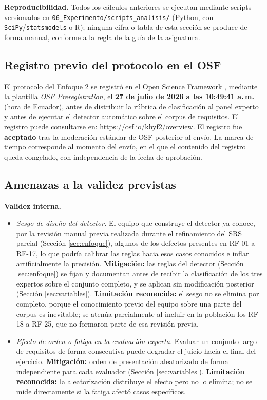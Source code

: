 \documentclass[journal,onecolumn]{IEEEtran}
\begin{document}
	\textbf{Reproducibilidad.} Todos los cálculos anteriores se ejecutan
	mediante scripts versionados en \texttt{06\_Experimento/scripts\_analisis/}
	(Python, con \texttt{SciPy}/\texttt{statsmodels} o R); ninguna cifra o
	tabla de esta sección se produce de forma manual, conforme a la regla de
	la guía de la asignatura.
	
	\subsection{Registro previo del protocolo en el OSF}
	\label{sec:osf}
	
	El protocolo del Enfoque 2 se registró en el Open Science Framework
	\cite{nosek2018}, mediante la plantilla \emph{OSF Preregistration}, el
	\textbf{27 de julio de 2026 a las 10:49:41 a.\,m.} (hora de Ecuador), antes
	de distribuir la rúbrica de clasificación al panel experto y antes de
	ejecutar el detector automático sobre el corpus de requisitos. El registro
	puede consultarse en:
	\url{https://osf.io/khyf2/overview}.
	El registro fue \textbf{aceptado} tras la moderación estándar de OSF
	posterior al envío. La marca de tiempo corresponde al momento del envío, en
	el que el contenido del registro queda congelado, con independencia de la
	fecha de aprobación.
	
	\subsection{Amenazas a la validez previstas}
	\label{sec:amenazas}
	
	\textbf{Validez interna.}
	\begin{itemize}[leftmargin=*]
		\item \emph{Sesgo de diseño del detector.} El equipo que construye el
		detector ya conoce, por la revisión manual previa realizada durante
		el refinamiento del SRS parcial (Sección \ref{sec:enfoque}), algunos
		de los defectos presentes en RF-01 a RF-17, lo que podría calibrar
		las reglas hacia esos casos conocidos e inflar artificialmente la
		precisión. \textbf{Mitigación:}
		las reglas del detector (Sección \ref{sec:enfoque}) se fijan y
		documentan antes de recibir la clasificación de los tres expertos
		sobre el conjunto completo, y se aplican sin modificación posterior
		(Sección \ref{sec:variables}). \textbf{Limitación reconocida:} el
		sesgo no se elimina por completo, porque el conocimiento previo del
		equipo sobre una parte del corpus es inevitable; se atenúa
		parcialmente al incluir en la población los RF-18 a RF-25, que no
		formaron parte de esa revisión previa.
		\item \emph{Efecto de orden o fatiga en la evaluación experta.}
		Evaluar un conjunto largo de requisitos de forma consecutiva puede
		degradar el juicio hacia el final del ejercicio. \textbf{Mitigación:}
		orden de presentación aleatorizado de forma independiente para cada
		evaluador (Sección \ref{sec:variables}). \textbf{Limitación
			reconocida:} la aleatorización distribuye el efecto pero no lo
		elimina; no se mide directamente si la fatiga afectó casos
		específicos.
	\end{itemize}
	
\end{document}
